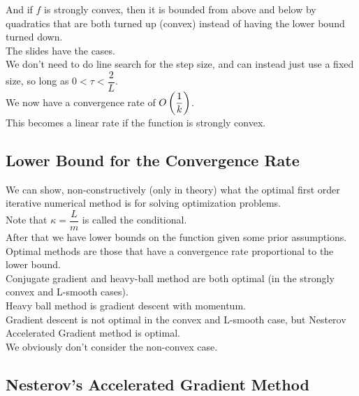 \documentclass[12pt]{article}
\begin{document}
And if $f$ is strongly convex, then it is
bounded from above and below by quadratics
that are both turned up (convex)
instead of having the lower bound turned down. \\

The slides have the cases. \\

We don't need to do line search for the step
size, and can instead just use a fixed
size, so long as $0 < \tau < \dfrac{2}{L}$. \\

We now have a convergence rate
of $O\left( \dfrac{1}{k} \right)$. \\

This becomes a linear rate if the function
is strongly convex. \\

\newpage

\subsection*{Lower Bound for the Convergence Rate}

We can show, non-constructively (only in theory)
what the optimal first order iterative
numerical method is for solving
optimization problems. \\

Note that $\kappa = \dfrac{L}{m}$
is called the conditional. \\

After that we have lower bounds on the
function given some prior assumptions. \\

Optimal methods are those that have a convergence
rate proportional to the lower bound. \\

Conjugate gradient and heavy-ball method
are both optimal (in the strongly convex and 
L-smooth cases). \\

Heavy ball method is gradient descent 
with momentum. \\

Gradient descent is not optimal
in the convex and L-smooth case,
but Nesterov Accelerated Gradient method
is optimal. \\

We obviously don't consider the non-convex case. \\

\newpage

\subsection*{Nesterov's Accelerated Gradient
Method}
\end{document}
